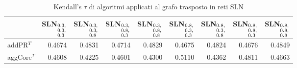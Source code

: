 \begin{table}[!htbp]
  \caption{Kendall's $\tau$ di algoritmi applicati al grafo trasposto in reti SLN}
  \label{tab:tauslnT}
    \centering
    \begin{tabular}{lrrrrrrrr}
        \toprule
          & SLN$_{\begin{subarray}{l} 0.3\text{,} \\ 0.3\text{,} \\ 0.3 \end{subarray}}$ 
          & SLN$_{\begin{subarray}{l} 0.3\text{,} \\ 0.3\text{,} \\ 0.8 \end{subarray}}$ 
          & SLN$_{\begin{subarray}{l} 0.3\text{,} \\ 0.8\text{,} \\ 0.3 \end{subarray}}$ 
          & SLN$_{\begin{subarray}{l} 0.3\text{,} \\ 0.8\text{,} \\ 0.8 \end{subarray}}$ 
          & SLN$_{\begin{subarray}{l} 0.8\text{,} \\ 0.3\text{,} \\ 0.3 \end{subarray}}$ 
          & SLN$_{\begin{subarray}{l} 0.8\text{,} \\ 0.3\text{,} \\ 0.8 \end{subarray}}$ 
          & SLN$_{\begin{subarray}{l} 0.8\text{,} \\ 0.8\text{,} \\ 0.3 \end{subarray}}$ 
          & SLN$_{\begin{subarray}{l} 0.8\text{,} \\ 0.8\text{,} \\ 0.8 \end{subarray}}$ \\
        \midrule
          addPR$^T$ &    {\num{ 0.4674}} &   {\num{ 0.4831}} &   {\num{ 0.4714}} &   {\num{ 0.4829}} &   {\num{ 0.4675}} &   {\num{ 0.4824}} &   {\num{ 0.4676}} &   {\num{ 0.4849}} \\
        aggCore$^T$ &    {\num{ 0.4608}} &   {\num{ 0.4225}} &   {\num{ 0.4601}} &   {\num{ 0.4300}} &   {\num{ 0.5110}} &   {\num{ 0.4362}} &   {\num{ 0.4811}} &   {\num{ 0.4663}} \\

\end{tabular}
\end{table}
